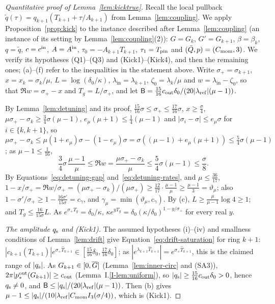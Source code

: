 \begin{proof}[Quantitative proof of Lemma~\ref{lem:kicktrue}]
Recall the local pullback $\tilde q(\tau)=q_{k+1}(T_{k+1}+\tau/A_{k+1})$
from Lemma~\ref{lem:coupling}. We apply Proposition~\ref{prop:kick} to the instance described after
Lemma~\ref{lem:coupling} (an instance of its setting by
Lemma~\ref{lem:coupling}\textup{(2)}): $G=G_k$, $G'=G_{k+1}$, $\beta=\beta_k$,
$q=\tilde q$, $c=c^{\mathrm{in}}$, $A=A^{\mathrm{in}}$, $\tau_0=-A_{k+1}T_{k+1}$, $\tau_1=T_{\mathrm{pin}}$ and
$(\bar Q,p)=(C_{\mathrm{mom}},3)$. We verify its hypotheses (Q1)--(Q3) and (Kick1)--(Kick4),
and then the remaining ones; (a)--(f) refer to the inequalities in the statement
above. Write $\sigma_+=\sigma_{k+1}$, $x=x_k=\sigma_k/\mu$,
$L=\log(\delta_0/\kappa)$, $\lambda_{\mathrm{in}}=\lambda_{k+1}$, $\zeta_0=\lambda_k/\mu$ and
$w=\lambda_{\mathrm{in}}-\zeta_0$, so that $\Re w=\sigma_+-x$ and $T_g=L/\sigma_+$, and let
$\mathsf B=\frac{15}{16}c_{\mathrm{out}}\delta_0/(20|\lambda_{\mathrm{ref}}|(\mu-1))$.

By Lemma~\ref{lem:detuning} and its proof,
$\frac{15}{16}\sigma\le\sigma_+\le\frac{17}{16}\sigma$, $x\ge\frac\sigma4$,
$\mu\sigma_+-\sigma_k\ge\frac34\sigma(\mu-1)$, $e_\mu(\mu+1)\le\frac14(\mu-1)$ and
$|\sigma_i-\sigma|\le e_\mu\sigma$ for $i\in\{k,k+1\}$, so
$\mu\sigma_+-\sigma_k\le\mu(1+e_\mu)\sigma-(1-e_\mu)\sigma=\sigma((\mu-1)+e_\mu(\mu+1))\le\frac54\sigma(\mu-1)$; as
$\mu-1\le\frac1{16}$,
\begin{equation}
\label{eq:Rew}
\frac34\sigma\,\frac{\mu-1}\mu\le\Re w=\frac{\mu\sigma_+-\sigma_k}\mu\le\frac54\sigma(\mu-1)\le\frac\sigma8 .
\end{equation}
By Equations~\eqref{eq:detuning-gap} and~\eqref{eq:detuning-rates}, and $\mu\le\frac{36}{17}$,
$1-x/\sigma_+=\Re w/\sigma_+=(\mu\sigma_+-\sigma_k)/(\mu\sigma_+)\ge\frac{12}{17}\cdot\frac{\mu-1}\mu\ge\frac{\mu-1}3=\vartheta_\mu$;
also $1-\sigma'/\sigma_+\ge1-\frac{16\sigma'}{15\sigma}=c_\gamma$, and
$\gamma_\mu=\min(\vartheta_\mu,c_\gamma)$. By (c), $L\ge\frac\mu{\mu-1}\log4\ge1$;
and $T_g\le\frac{16}{15\sigma}L$. As $e^{\sigma_+T_g}=\delta_0/\kappa$,
$\kappa e^{yT_g}=\delta_0(\kappa/\delta_0)^{1-y/\sigma_+}$ for every real $y$.

\emph{The amplitude $q_{\mathrm{s}}$ and (Kick1).} The assumed hypotheses
\textup{(i)}--\textup{(iv)} and smallness conditions of Lemma~\ref{lem:drift}
give Equation~\eqref{eq:drift-saturation} for ring $k+1$:
$|c_{k+1}(T_{k+1})|e^{\sigma_+\hat T_{k+1}}\in[\frac{15}{16}\delta_0,\frac{17}{16}\delta_0]$;
as $|e^{\lambda_{k+1}\hat T_{k+1}}|=e^{\sigma_+\hat T_{k+1}}$, this is the claimed
range of $|q_{\mathrm{s}}|$. As
$G_{k+1}\in[0,\overline{G}]$ (Lemma~\ref{lem:inner-circ} and (SA3)), $2\pi|p^{\mathrm{out}}_*(G_{k+1})|\ge c_{\mathrm{out}}$ (Lemma~I.\ref{I-lem:uniform}),
so $|q_{\mathrm{s}}|\ge\frac{15}{16}c_{\mathrm{out}}\delta_0>0$, hence $q_{\mathrm{s}}\ne0$, and $\mathsf B\le|q_{\mathrm{s}}|/(20|\lambda_{\mathrm{ref}}|(\mu-1))$. Then
(b) gives $\mu-1\le|q_{\mathrm{s}}|/(10|\lambda_{\mathrm{ref}}|C_{\mathrm{mom}}I_{3}(\sigma/4))$, which is (Kick1).


\end{proof}

